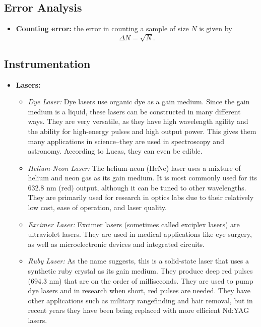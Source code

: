 \documentclass[%
 reprint,
superscriptaddress,
 amsmath,amssymb,
 aps,
prc,
]{revtex4-1}
\begin{document}
\subsection{Error Analysis}
\begin{itemize}
	\item \textbf{Counting error:} the error in counting a sample of size $N$ is given by
	\begin{equation}
		\Delta N = \sqrt{N}.
	\end{equation}
\end{itemize}

\subsection{Instrumentation}
\begin{itemize}
	\item \textbf{Lasers:}
	\begin{itemize}
		\item \textit{Dye Laser:} Dye lasers use organic dye as a gain medium. Since the gain medium is a liquid, these lasers can be constructed in many different ways. They are very versatile, as they have high wavelength agility and the ability for high-energy pulses and high output power. This gives them many applications in science--they are used in spectroscopy and astronomy. According to Lucas, they can even be edible.
		
		\item \textit{Helium-Neon Laser:} The helium-neon (HeNe) laser uses a mixture of helium and neon gas as its gain medium. It is most commonly used for its 632.8 nm (red) output, although it can be tuned to other wavelengths. They are primarily used for research in optics labs due to their relatively low cost, ease of operation, and laser quality.
		
		\item \textit{Excimer Laser:} Excimer lasers (sometimes called exciplex lasers) are ultraviolet lasers. They are used in medical applications like eye surgery, as well as microelectronic devices and integrated circuits.
		
		\item \textit{Ruby Laser:} As the name suggests, this is a solid-state laser that uses a synthetic ruby crystal as its gain medium. They produce deep red pulses (694.3 nm) that are on the order of milliseconds. They are used to pump dye lasers and in research when short, red pulses are needed. They have other applications such as military rangefinding and hair removal, but in recent years they have been being replaced with more efficient Nd:YAG lasers.
		

\end{itemize}
\end{itemize}
\end{document}
